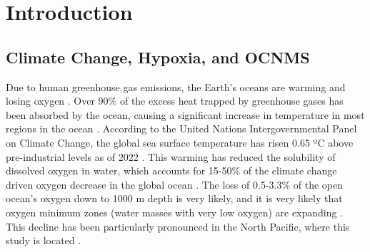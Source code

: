 \documentclass[12pt,twoside]{reedthesis}
\begin{document}
	

  \mainmatter %
  \pagestyle{fancyplain} %


    \chapter*{Introduction}

	

\section{Climate Change, Hypoxia, and OCNMS}

Due to human greenhouse gas emissions, the Earth's oceans are warming and losing oxygen \autocite{Portner2022, Ito2017}. Over 90\% of the excess heat trapped by greenhouse gases has been absorbed by the ocean, causing a significant increase in temperature in most regions in the ocean \autocite{Bindoff2013}. According to the United Nations Intergovernmental Panel on Climate Change, the global sea surface temperature has risen 0.65 ºC above pre-industrial levels as of 2022 \autocite{Portner2019}. This warming has reduced the solubility of dissolved oxygen in water, which accounts for 15-50\% of the climate change driven oxygen decrease in the global ocean \autocite{Helm2011, Ito2017, Schmidtko2017}. The loss of 0.5-3.3\% of the open ocean's oxygen down to 1000 m depth is very likely, and it is very likely that oxygen minimum zones (water masses with very low oxygen) are expanding \autocite{Bindoff2013}. This decline has been particularly pronounced in the North Pacific, where this study is located \autocite{Bindoff2013, Ito2017}.
\end{document}
